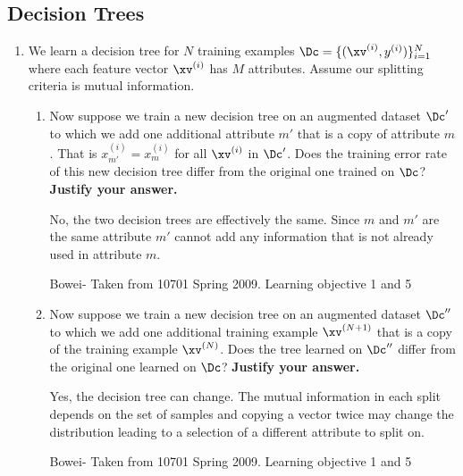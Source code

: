 \subsection{Decision Trees}
\begin{enumerate}
    \item{} We learn a decision tree for $N$ training examples $\Dc = \{ (\xv^{(i)}, y^{(i)}) \}_{i=1}^N$ where each feature vector $\xv^{(i)}$ has $M$ attributes. Assume our splitting criteria is mutual information.
    
    \begin{enumerate}[label=\roman*)]
        \item Now suppose we train a new decision tree on an augmented dataset $\Dc'$ to which we add one additional attribute $m'$ that is a copy of attribute $m$. That is $x_{m'}^{(i)} = x_{m}^{(i)}$ for all $\xv^{(i)}$ in $\Dc'$. Does the training error rate of this new decision tree differ from the original one trained on $\Dc$? \textbf{Justify your answer.}
        \fillwithlines{10em}
        
        \begin{soln}
        No, the two decision trees are effectively the same. Since $m$ and $m'$ are the same attribute $m'$ cannot add any information that is not already used in attribute $m$. 
        \end{soln}
        
        \begin{qauthor}
        Bowei- Taken from 10701 Spring 2009. Learning objective 1 and 5
        \end{qauthor}
        
        \item Now suppose we train a new decision tree on an augmented dataset $\Dc''$ to which we add one additional training example $\xv^{(N+1)}$ that is a copy of the training example $\xv^{(N)}$. Does the tree learned on $\Dc''$ differ from the original one learned on $\Dc$? \textbf{Justify your answer.}
        \fillwithlines{10em}
        
        \begin{soln}
        Yes, the decision tree can change. The mutual information in each split depends on the set of samples and copying a vector twice may change the distribution leading to a selection of a different attribute to split on. 
        \end{soln}
        
        \begin{qauthor}
        Bowei- Taken from 10701 Spring 2009. Learning objective 1 and 5
        \end{qauthor}
    
    \end{enumerate}
    
\end{enumerate}

